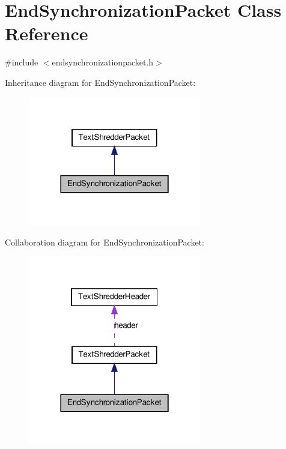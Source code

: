 \hypertarget{class_end_synchronization_packet}{
\section{EndSynchronizationPacket Class Reference}
\label{class_end_synchronization_packet}
}


{\ttfamily \#include $<$endsynchronizationpacket.h$>$}



Inheritance diagram for EndSynchronizationPacket:\nopagebreak
\begin{figure}[H]
\begin{center}
\leavevmode
\includegraphics[width=214pt]{class_end_synchronization_packet__inherit__graph}
\end{center}
\end{figure}


Collaboration diagram for EndSynchronizationPacket:\nopagebreak
\begin{figure}[H]
\begin{center}
\leavevmode
\includegraphics[width=214pt]{class_end_synchronization_packet__coll__graph}
\end{center}
\end{figure}
